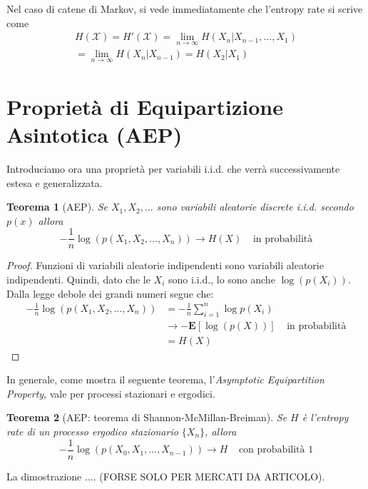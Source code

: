 \documentclass[a4paper,11pt]{book}
\theoremstyle{plain}
\newtheorem{teo}{Teorema}[chapter]
\theoremstyle{definition}
\theoremstyle{remark}
\begin{document}
Nel caso di catene di Markov, si vede immediatamente che l'entropy rate si scrive come
\begin{align}
	H(\mathcal{X}) = H'(\mathcal{X}) = \lim\limits_{n\to \infty}H(X_n|X_{n-1},\ldots, X_1) \\
	= \lim \limits_{n\to \infty}H(X_n|X_{n-1} ) =H(X_2|X_1)
\end{align}
\section{Proprietà di Equipartizione Asintotica (AEP)}
Introduciamo ora una proprietà per variabili i.i.d. che verrà successivamente estesa e generalizzata.
\begin{teo}[AEP]
	Se $X_1, X_2 , \ldots$ sono variabili aleatorie discrete i.i.d. secondo $p(x)$ allora
	\begin{equation*}
		-\frac{1}{n}\log(p(X_1,X_2, \ldots , X_n))\rightarrow H(X) \;\;\;\; \text{in probabilità}
	\end{equation*}
\end{teo}
\begin{proof}
	Funzioni di variabili aleatorie indipendenti sono variabili aleatorie indipendenti. Quindi, dato che le $X_i$ sono i.i.d., lo sono anche $\log(p(X_i))$. Dalla legge debole dei grandi numeri segue che:
	\begin{equation*}
		\begin{split}
		-\frac{1}{n}\log(p(X_1,X_2,\ldots,X_n)) & = -\frac{1}{n}\sum_{i = 1}^{n}\log p(X_i) \\
		& \rightarrow -\mathbf{E}[\log(p(X))] \;\;\;\; \text{in probabilità} \\
		& = H(X)
		\end{split}
	\end{equation*}
\end{proof}

In generale, come mostra il seguente teorema, l'\textit{Asymptotic Equipartition Property}, vale per processi stazionari e ergodici.
\begin{teo}[AEP: teorema di Shannon-McMillan-Breiman]
	Se $H$ è l'entropy rate di un processo ergodico stazionario $\{X_n\}$, allora
	\begin{equation*}
		-\frac{1}{n}\log(p(X_0,X_1,\ldots,X_{n-1}))\rightarrow H \;\;\;\; \text{con probabilità } 1
	\end{equation*}
\end{teo}
La dimostrazione .... (FORSE SOLO PER MERCATI DA ARTICOLO).
\end{document}
